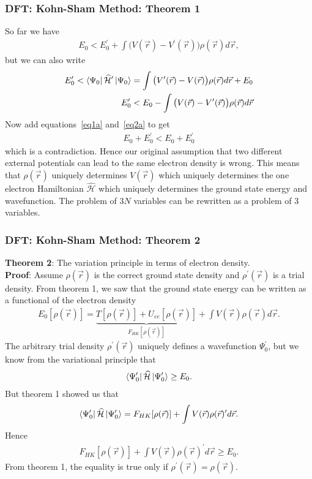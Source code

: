 \documentclass{beamer}
\newcommand{\Ham}{\widehat{\mathcal{H}}}
\newcommand{\rhovr}{\rho(\vec{r})}
\newenvironment{noheadline}{
	\setbeamertemplate{headline}{}
	\addtobeamertemplate{frametitle}{\vspace*{-0.9\baselineskip}}{}
}{}
\begin{document}
\begin{noheadline}
\begin{frame}
\frametitle{DFT: Kohn-Sham Method: Theorem 1}
{\tiny
	So far we have
	\begin{align}
	E_{0} < E^{\prime}_{0} + \int \big( V(\vec{r}) - V^{\prime}(\vec{r}) \big) \rho(\vec{r}) d\vec{r},
	\label{eq1a}
	\end{align}
	but we can also write
	\begin{align}
	\nonumber E^{\prime}_{0} < \bra{\Psi_{0}} \Ham^{\prime} \ket{\Psi_{0}} = \int \big( V^{\prime}(\vec{r}) - V(\vec{r}) \big) \rho(\vec{r}) d\vec{r} + E_{0}\\
	E^{\prime}_{0} < E_{0} - \int \big( V(\vec{r}) - V^{\prime}(\vec{r}) \big) \rho(\vec{r}) d\vec{r}
	\label{eq2a}
	\end{align}
	Now add equations~\ref{eq1a} and~\ref{eq2a} to get
	\begin{align*}
	E_{0} + E^{\prime}_{0} < E_{0} + E^{\prime}_{0}
	\end{align*}
	which is a contradiction. Hence our original assumption that two different external potentials can lead to the same electron density is wrong. This means that $\rhovr$ uniquely determines $V(\vec{r})$ which uniquely determines the one electron Hamiltonian $\Ham$ which uniquely determines the ground state energy and wavefunction. The problem of $3N$ variables can be rewritten as a problem of 3 variables.
}
\end{frame}


\begin{frame}
\frametitle{DFT: Kohn-Sham Method: Theorem 2}
{\tiny
	\textbf{Theorem 2}: The variation principle in terms of electron density.\\
	
	\textbf{Proof}: Assume $\rho(\vec{r})$ is the correct ground state density and $\rho^{\prime}(\vec{r})$ is a trial density. From theorem 1, we saw that the ground state energy can be written as a functional of the electron density
	\begin{align*}
	E_{0}[\rhovr] = \underbrace{T[\rhovr] + U_{ee} [\rhovr]}_{F_{HK}[\rhovr]} + \int V(\vec{r}) \rhovr d\vec{r}.
	\end{align*}
	The arbitrary trial density $\rho^{\prime}(\vec{r})$ uniquely defines a wavefunction $\Psi_{0}^{\prime}$, but we know from the variational principle that
	\begin{align*}
	\bra{\Psi^{\prime}_{0}} \Ham \ket{\Psi^{\prime}_{0}} \geq E_{0}.
	\end{align*}
	But theorem 1 showed us that
	\begin{align*}
	\bra{\Psi^{\prime}_{0}} \Ham \ket{\Psi^{\prime}_{0}} = F_{HK}[\rhovr] + \int V(\vec{r}) \rhovr^{\prime} d\vec{r}.
	\end{align*}
	Hence
	\begin{align*}
	F_{HK}[\rhovr] + \int V(\vec{r}) \rhovr^{\prime} d\vec{r} \geq E_{0}.
	\end{align*}
	From theorem 1, the equality is true only if $\rho^{\prime}(\vec{r}) = \rho(\vec{r})$.
}
\end{frame}


\end{noheadline}
\end{document}
